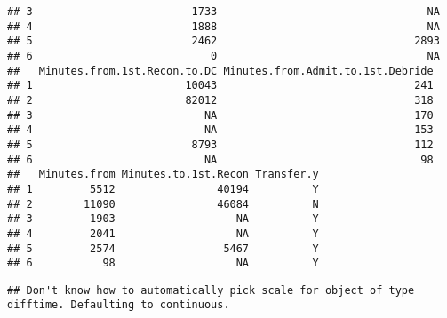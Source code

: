 \documentclass[]{article}
\newenvironment{Shaded}{\begin{snugshade}}{\end{snugshade}}
\newcommand{\DataTypeTok}[1]{\textcolor[rgb]{0.13,0.29,0.53}{#1}}
\newcommand{\DecValTok}[1]{\textcolor[rgb]{0.00,0.00,0.81}{#1}}
\newcommand{\KeywordTok}[1]{\textcolor[rgb]{0.13,0.29,0.53}{\textbf{#1}}}
\newcommand{\NormalTok}[1]{#1}
\newcommand{\OperatorTok}[1]{\textcolor[rgb]{0.81,0.36,0.00}{\textbf{#1}}}
\newcommand{\StringTok}[1]{\textcolor[rgb]{0.31,0.60,0.02}{#1}}
\begin{document}
\begin{verbatim}
## 3                         1733                                 NA
## 4                         1888                                 NA
## 5                         2462                               2893
## 6                            0                                 NA
##   Minutes.from.1st.Recon.to.DC Minutes.from.Admit.to.1st.Debride
## 1                        10043                               241
## 2                        82012                               318
## 3                           NA                               170
## 4                           NA                               153
## 5                         8793                               112
## 6                           NA                                98
##   Minutes.from Minutes.to.1st.Recon Transfer.y
## 1         5512                40194          Y
## 2        11090                46084          N
## 3         1903                   NA          Y
## 4         2041                   NA          Y
## 5         2574                 5467          Y
## 6           98                   NA          Y
\end{verbatim}

\begin{Shaded}
\end{Shaded}

\begin{verbatim}
## Don't know how to automatically pick scale for object of type difftime. Defaulting to continuous.
\end{verbatim}
\end{document}
